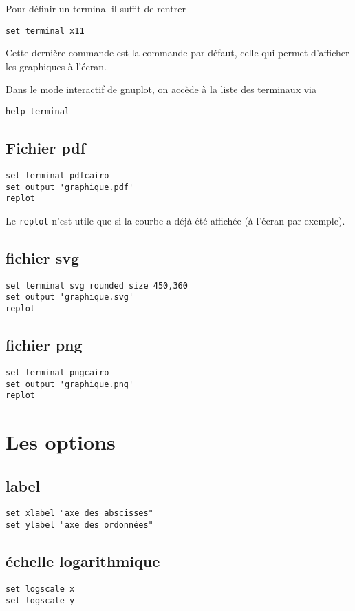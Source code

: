 \documentclass[a4paper,twoside]{article}
\begin{document}
Pour définir un terminal il suffit de rentrer
\begin{verbatim}
set terminal x11
\end{verbatim}
Cette dernière commande est la commande par défaut, celle qui permet d'afficher les graphiques à l'écran.

Dans le mode interactif de gnuplot, on accède à la liste des terminaux via
\begin{verbatim}
help terminal
\end{verbatim}


\subsection{Fichier pdf}
\begin{verbatim}
set terminal pdfcairo
set output 'graphique.pdf'
replot
\end{verbatim}

\begin{remarque}
Le \texttt{replot} n'est utile que si la courbe a déjà été affichée (à l'écran par exemple).
\end{remarque}

\subsection{fichier svg}
\begin{verbatim}
set terminal svg rounded size 450,360
set output 'graphique.svg'
replot
\end{verbatim}

\subsection{fichier png}
\begin{verbatim}
set terminal pngcairo
set output 'graphique.png'
replot
\end{verbatim}


\section{Les options}
\subsection{label}
\begin{verbatim}
set xlabel "axe des abscisses"
set ylabel "axe des ordonnées"
\end{verbatim}

\subsection{échelle logarithmique}
\begin{verbatim}
set logscale x
set logscale y
\end{verbatim}
\end{document}
